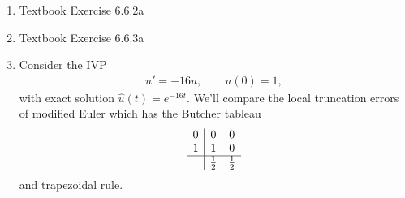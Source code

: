 \documentclass[reqno, answers]{exam}
\begin{document}
\begin{enumerate}
\begin{solution}
\begin{parts}
At $x_2 = 9/4$: $\widehat{y}(9/4) = 8/9 \approx 0.8889$

Numerical approximation: $u_1^{(2)} = 113/128 \approx 0.8828$

$$\text{Error} = \left|\frac{8}{9} - \frac{113}{128}\right| = \frac{7}{1152} \approx 0.0061$$

\end{parts}

\end{solution}

  \item Textbook Exercise 6.6.2a
  \begin{solution}


\end{solution}
  \item Textbook Exercise 6.6.3a
\begin{solution}


\end{solution}

  \item Consider the IVP 
  \begin{align*}
    u' = -16u, \hspace{2em}
    u(0) = 1,
  \end{align*}
  with exact solution $\widehat{u}(t) = e^{-16t}$. We'll compare the local truncation errors of modified Euler which has the Butcher tableau 
  \begin{equation*}
  \begin{array}{c|cc}
  0 & 0 & 0 \\
  1 & 1 & 0 \\
  \hline
  & \frac{1}{2} & \frac{1}{2}
  \end{array}
  \end{equation*}
  and trapezoidal rule.
  \begin{parts}

\end{parts}
\end{enumerate}
\end{document}
